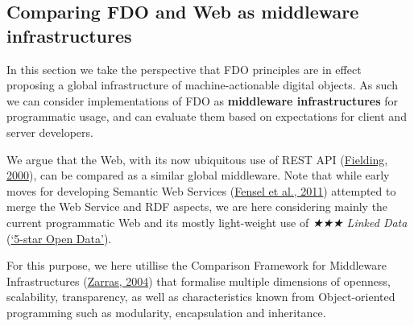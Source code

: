 \hypertarget{sec:middleware}{%
\subsection{Comparing FDO and Web as middleware infrastructures}\label{sec:middleware}}

In this section we take the perspective that FDO principles are in effect proposing a global infrastructure of machine-actionable digital objects. As such we can consider implementations of FDO as \textbf{middleware infrastructures} for programmatic usage, and can evaluate them based on expectations for client and server developers.

We argue that the Web, with its now ubiquitous use of REST API (\protect\hyperlink{ref-174AwcFUL}{Fielding, 2000}), can be compared as a similar global middleware. Note that while early moves for developing Semantic Web Services (\protect\hyperlink{ref-WzPECPDP}{Fensel et al., 2011}) attempted to merge the Web Service and RDF aspects, we are here considering mainly the current programmatic Web and its mostly light-weight use of \emph{★★★ Linked Data} (\protect\hyperlink{ref-11dInoyVF}{{`5-star Open Data'}}).

For this purpose, we here utillise the Comparison Framework for Middleware Infrastructures (\protect\hyperlink{ref-hRzcHhPD}{Zarras, 2004}) that formalise multiple dimensions of openness, scalability, transparency, as well as characteristics known from Object-oriented programming such as modularity, encapsulation and inheritance.

